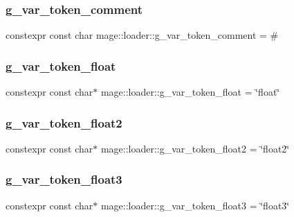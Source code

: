 \subsubsection{\texorpdfstring{g\+\_\+var\+\_\+token\+\_\+comment}{g\_var\_token\_comment}}
{\footnotesize\ttfamily constexpr const char mage\+::loader\+::g\+\_\+var\+\_\+token\+\_\+comment = \textquotesingle{}\#\textquotesingle{}}

\hypertarget{namespacemage_1_1loader_a3732f74f1d4aec47eb9957a310d59acf}{}\label{namespacemage_1_1loader_a3732f74f1d4aec47eb9957a310d59acf} 
\subsubsection{\texorpdfstring{g\+\_\+var\+\_\+token\+\_\+float}{g\_var\_token\_float}}
{\footnotesize\ttfamily constexpr const char$\ast$ mage\+::loader\+::g\+\_\+var\+\_\+token\+\_\+float = \char`\"{}float\char`\"{}}

\hypertarget{namespacemage_1_1loader_ac1ec2d32ca513327528e23ffebb92be0}{}\label{namespacemage_1_1loader_ac1ec2d32ca513327528e23ffebb92be0} 
\subsubsection{\texorpdfstring{g\+\_\+var\+\_\+token\+\_\+float2}{g\_var\_token\_float2}}
{\footnotesize\ttfamily constexpr const char$\ast$ mage\+::loader\+::g\+\_\+var\+\_\+token\+\_\+float2 = \char`\"{}float2\char`\"{}}

\hypertarget{namespacemage_1_1loader_a70b076251ea234128736d1a8c6761d4c}{}\label{namespacemage_1_1loader_a70b076251ea234128736d1a8c6761d4c} 
\subsubsection{\texorpdfstring{g\+\_\+var\+\_\+token\+\_\+float3}{g\_var\_token\_float3}}
{\footnotesize\ttfamily constexpr const char$\ast$ mage\+::loader\+::g\+\_\+var\+\_\+token\+\_\+float3 = \char`\"{}float3\char`\"{}}

